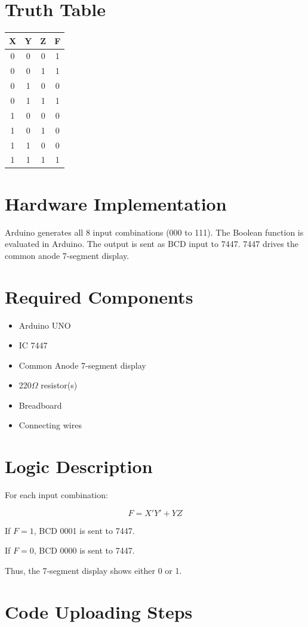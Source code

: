 \documentclass[12pt,a4paper]{article}
\newcommand{\bluesection}[1]{
\section*{\color{blue}#1}
}
\begin{document}
\bluesection{Truth Table}

\begin{center}
\begin{tabular}{|c|c|c|c|}
\hline
X & Y & Z & F \\ \hline
0 & 0 & 0 & 1 \\ \hline
0 & 0 & 1 & 1 \\ \hline
0 & 1 & 0 & 0 \\ \hline
0 & 1 & 1 & 1 \\ \hline
1 & 0 & 0 & 0 \\ \hline
1 & 0 & 1 & 0 \\ \hline
1 & 1 & 0 & 0 \\ \hline
1 & 1 & 1 & 1 \\ \hline
\end{tabular}
\end{center}

\bluesection{Hardware Implementation}

Arduino generates all 8 input combinations (000 to 111).  
The Boolean function is evaluated in Arduino.  
The output is sent as BCD input to 7447.  
7447 drives the common anode 7-segment display.

\bluesection{Required Components}

\begin{itemize}
    \item Arduino UNO
    \item IC 7447
    \item Common Anode 7-segment display
    \item 220$\Omega$ resistor(s)
    \item Breadboard
    \item Connecting wires
\end{itemize}

\bluesection{Logic Description}

For each input combination:

\[
F = X'Y' + YZ
\]

If $F = 1$, BCD 0001 is sent to 7447.  

If $F = 0$, BCD 0000 is sent to 7447.  

Thus, the 7-segment display shows either 0 or 1.

\bluesection{Code Uploading Steps}
\end{document}
